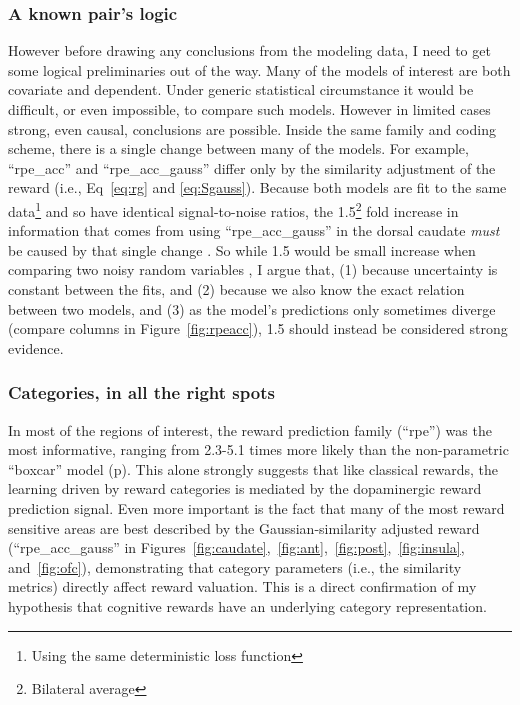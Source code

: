 \documentclass[doc,12pt]{apa}        %
\begin{document}
\subsubsection{A known pair's logic}
\label{subsub:onestep}
However before drawing any conclusions from the modeling data, I need to get some logical preliminaries out of the way.  Many of the models of interest are both covariate and dependent.  Under generic statistical circumstance it would be difficult, or even impossible, to compare such models.  However in limited cases strong, even causal, conclusions are possible.   Inside the same family and coding scheme, there is a single change between many of the models.  For example, ``rpe\_acc'' and ``rpe\_acc\_gauss'' differ only by the similarity adjustment of the reward (i.e., Eq~\ref{eq:rg} and \ref{eq:Sgauss}).  Because both models are fit to the same data\footnote{
    Using the same deterministic loss function} and so have identical signal-to-noise ratios, the 1.5\footnote{Bilateral average} fold increase in information that comes from using ``rpe\_acc\_gauss'' in the dorsal caudate \emph{must} be caused by that single change \cite{Pearl:2010p9726}.  So while 1.5 would be small increase when comparing two noisy random variables \cite{Anderson:2000p9475,Forster:2000p9623}, I argue that, (1) because uncertainty is constant between the fits, and (2) because we also know the exact relation between two models, and (3) as the model's predictions only sometimes diverge (compare columns in Figure~\ref{fig:rpeacc}), 1.5 should instead be considered strong evidence.

\subsubsection{Categories, in all the right spots}
\label{subsub:rightspots}
In most of the regions of interest, the reward prediction family (``rpe'') was the most informative, ranging from 2.3-5.1 times more likely than the non-parametric ``boxcar'' model (p\pageref{subsub:belowctx}).  This alone strongly suggests that like classical rewards, the learning driven by reward categories is mediated by the dopaminergic reward prediction signal.  Even more important is the fact that many of the most reward sensitive areas are best described by the Gaussian-similarity adjusted reward (``rpe\_acc\_gauss'' in Figures~\ref{fig:caudate},~\ref{fig:ant},~\ref{fig:post},~\ref{fig:insula}, and~\ref{fig:ofc}), demonstrating that category parameters (i.e., the similarity metrics) directly affect reward valuation.  This is a direct confirmation of my hypothesis that cognitive rewards have an underlying category representation.
\end{document}
